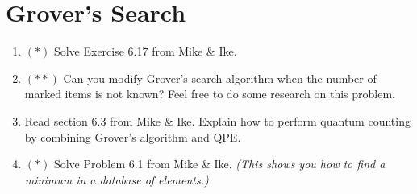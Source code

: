 \documentclass[10pt]{article}
\newcounter{ex}
\theoremstyle{plain}
\theoremstyle{definition}
\begin{document}
\section{Grover's Search}
\begin{enumerate}[label=(\roman*)]

\item $(\ast)$ Solve Exercise 6.17 from Mike \& Ike.

\item $(\ast \ast)$ Can you modify Grover's search algorithm when the number of marked items is not known? Feel free to do some research on this problem.

\item Read section 6.3 from Mike \& Ike. Explain how to perform quantum counting by combining Grover's algorithm and QPE.

\item $(\ast)$ Solve Problem 6.1 from Mike \& Ike. \textit{(This shows you how to find a minimum in a database of elements.)}

\end{enumerate}
\end{document}
